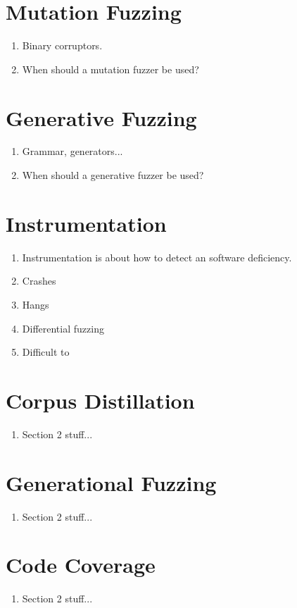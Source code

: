 \documentclass[12pt]{Training}
\begin{document}
\section*{Mutation Fuzzing}
\begin{enumerate}
    \item Binary corruptors.
	\item When should a mutation fuzzer be used?
\end{enumerate}

\section*{Generative Fuzzing}
\begin{enumerate}
	\item Grammar, generators...
	\item When should a generative fuzzer be used?
\end{enumerate}

\section*{Instrumentation}
\begin{enumerate}
	\item Instrumentation is about how to detect an software deficiency.
	\item Crashes
	\item Hangs
	\item Differential fuzzing
	\item Difficult to 
\end{enumerate}

\section*{Corpus Distillation}
\begin{enumerate}
	\item Section 2 stuff...
\end{enumerate}

\section*{Generational Fuzzing}
\begin{enumerate}
	\item Section 2 stuff...
\end{enumerate}

\section*{Code Coverage}
\begin{enumerate}
	\item Section 2 stuff...
\end{enumerate}
\end{document}
